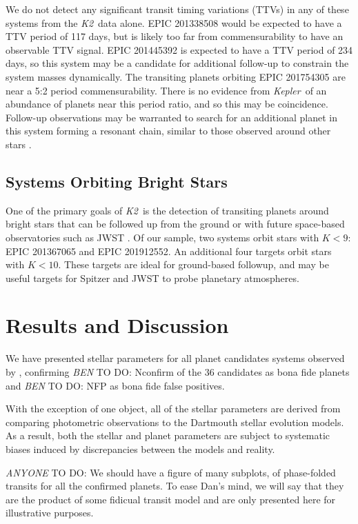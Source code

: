 \documentclass{emulateapj}
\newcommand{\project}[1]{\textsl{#1}}
\newcommand{\kep}{\project{Kepler}}
\newcommand{\KT}{\project{K2}}
\newcommand{\paperit}{\citet{Foreman-Mackey15}}
\newcommand{\todo}[3]{{\color{#2} \emph{#1} TO DO: #3}}
\newcommand{\btmtodo}[1]{\todo{BEN}{red}{#1}}
\newcommand{\anytodo}[1]{\todo{ANYONE}{NavyBlue}{#1}}
\begin{document}
We do not detect any significant transit timing variations (TTVs) in any of these systems from
the \KT\ data alone.
EPIC 201338508 would be expected to have a TTV period of 117 days, but
is likely too far from commensurability to have an observable TTV signal.
EPIC 201445392 is expected to have a TTV period of 234 days, so this system may be a candidate
for additional follow-up to constrain the system masses dynamically.
The transiting planets orbiting EPIC 201754305 are near a 5:2 period commensurability.
There is no evidence from \kep\ of an abundance of planets near this period ratio, and so this
may be coincidence.
Follow-up observations may be warranted to search for an additional planet in this system
forming a resonant chain, similar to those observed around other stars \citep[e.g.][]{Swift13,
Campante15}.

\subsection{Systems Orbiting Bright Stars}

One of the primary goals of \KT\ is the detection of transiting planets around bright stars that
can be followed up from the ground or with future space-based observatories such as JWST
\citep{Howell14}.
Of our sample, two systems orbit stars with $K < 9$: EPIC 201367065 \citep{Crossfield15} and
EPIC 201912552.
An additional four targets orbit stars with $K <10$.
These targets are ideal for ground-based followup, and may be useful targets for Spitzer and
JWST to probe planetary atmospheres.

\section{Results and Discussion}

We have presented stellar parameters for all planet candidates systems observed by
\paperit, confirming \btmtodo{Nconfirm} of the 36 candidates as bona fide planets and
\btmtodo{NFP} as bona fide false positives.

With the exception of one object, all of the stellar parameters are derived from comparing
photometric observations to the Dartmouth stellar evolution models.
As a result, both the stellar and planet parameters are subject to systematic biases induced
by discrepancies between the models and reality.


\anytodo{We should have a figure of many subplots, of phase-folded
transits for all the confirmed planets.
To ease Dan's mind, we will say that they are the product of
some fidicual transit model and are only presented here for illustrative
purposes.}
\end{document}
